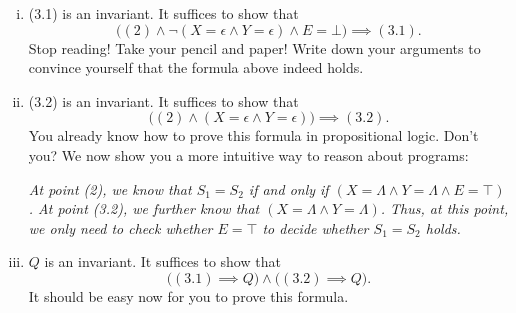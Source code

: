 \begin{enumerate}[(i)]
  \item (3.1) is an invariant. It suffices to show that
    \[
      \big((2) \land \lnot (X = \epsilon \land Y = \epsilon) \land E = \bot\big) \implies (3.1).
    \]
    Stop reading! Take your pencil and paper! 
    Write down your arguments to convince yourself that the formula above indeed holds.
  \item (3.2) is an invariant. It suffices to show that
    \[
      \big((2) \land (X = \epsilon \land Y = \epsilon)\big) \implies (3.2).
    \]
    You already know how to prove this formula in propositional logic. Don't you?
    We now show you a more intuitive way to reason about programs:

    \emph{At point (2), we know that $S_1 = S_2$ if and only if $(X = \Lambda \land Y = \Lambda \land E = \top)$.
    At point (3.2), we further know that $(X = \Lambda \land Y = \Lambda)$. 
    Thus, at this point, we only need to check whether $E = \top$ to decide whether $S_1 = S_2$ holds.}
  \item $Q$ is an invariant. It suffices to show that
    \[
      \big((3.1) \implies Q\big) \land \big((3.2) \implies Q\big).
    \]
    It should be easy now for you to prove this formula.
\end{enumerate}
